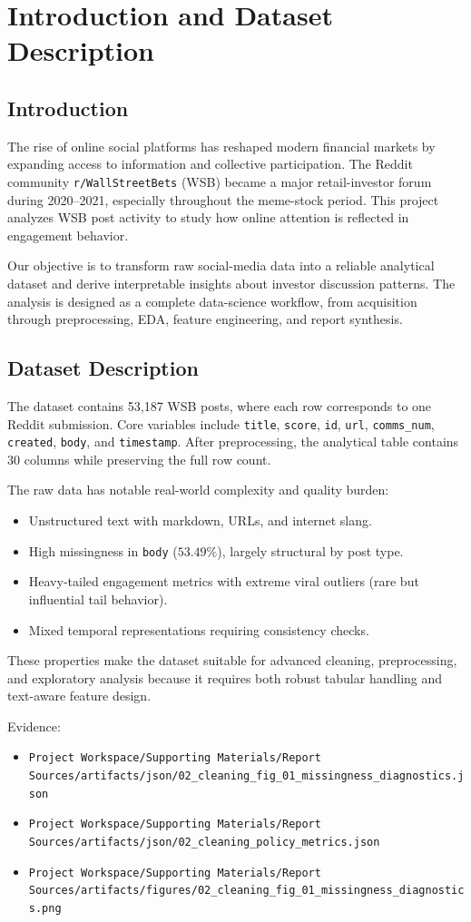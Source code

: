 \section{Introduction and Dataset Description}

\subsection{Introduction}
The rise of online social platforms has reshaped modern financial markets by expanding access to information and collective participation. The Reddit community \texttt{r/WallStreetBets} (WSB) became a major retail-investor forum during 2020--2021, especially throughout the meme-stock period. This project analyzes WSB post activity to study how online attention is reflected in engagement behavior.

Our objective is to transform raw social-media data into a reliable analytical dataset and derive interpretable insights about investor discussion patterns. The analysis is designed as a complete data-science workflow, from acquisition through preprocessing, EDA, feature engineering, and report synthesis.

\subsection{Dataset Description}
The dataset contains 53,187 WSB posts, where each row corresponds to one Reddit submission. Core variables include \texttt{title}, \texttt{score}, \texttt{id}, \texttt{url}, \texttt{comms\_num}, \texttt{created}, \texttt{body}, and \texttt{timestamp}. After preprocessing, the analytical table contains 30 columns while preserving the full row count.

The raw data has notable real-world complexity and quality burden:
\begin{itemize}
  \item Unstructured text with markdown, URLs, and internet slang.
  \item High missingness in \texttt{body} (\(53.49\%\)), largely structural by post type.
  \item Heavy-tailed engagement metrics with extreme viral outliers (rare but influential tail behavior).
  \item Mixed temporal representations requiring consistency checks.
\end{itemize}

These properties make the dataset suitable for advanced cleaning, preprocessing, and exploratory analysis because it requires both robust tabular handling and text-aware feature design.

Evidence:
\begin{itemize}
  \item \verb|Project Workspace/Supporting Materials/Report Sources/artifacts/json/02_cleaning_fig_01_missingness_diagnostics.json|
  \item \verb|Project Workspace/Supporting Materials/Report Sources/artifacts/json/02_cleaning_policy_metrics.json|
  \item \verb|Project Workspace/Supporting Materials/Report Sources/artifacts/figures/02_cleaning_fig_01_missingness_diagnostics.png|
\end{itemize}
